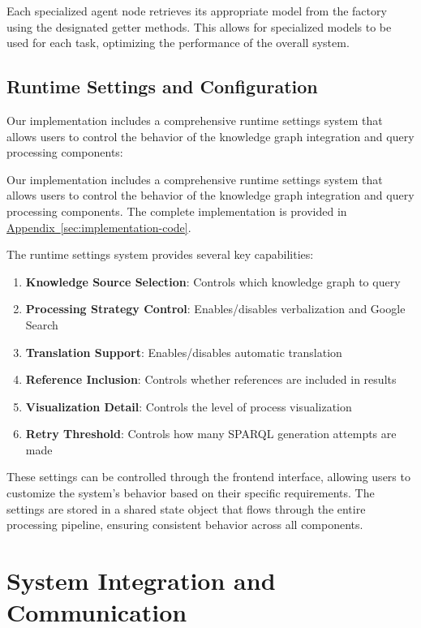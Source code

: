Each specialized agent node retrieves its appropriate model from the factory using the designated getter methods. This allows for specialized models to be used for each task, optimizing the performance of the overall system.

\subsection{Runtime Settings and Configuration}
Our implementation includes a comprehensive runtime settings system that allows users to control the behavior of the knowledge graph integration and query processing components:

Our implementation includes a comprehensive runtime settings system that allows users to control the behavior of the knowledge graph integration and query processing components. The complete implementation is provided in \hyperref[code:runtime-settings]{Appendix~\ref{sec:implementation-code}}.

The runtime settings system provides several key capabilities:

\begin{enumerate}
    \item \textbf{Knowledge Source Selection}: Controls which knowledge graph to query
    \item \textbf{Processing Strategy Control}: Enables/disables verbalization and Google Search
    \item \textbf{Translation Support}: Enables/disables automatic translation
    \item \textbf{Reference Inclusion}: Controls whether references are included in results
    \item \textbf{Visualization Detail}: Controls the level of process visualization
    \item \textbf{Retry Threshold}: Controls how many SPARQL generation attempts are made
\end{enumerate}

These settings can be controlled through the frontend interface, allowing users to customize the system's behavior based on their specific requirements. The settings are stored in a shared state object that flows through the entire processing pipeline, ensuring consistent behavior across all components.

\section{System Integration and Communication}
\label{sec:system-integration}

